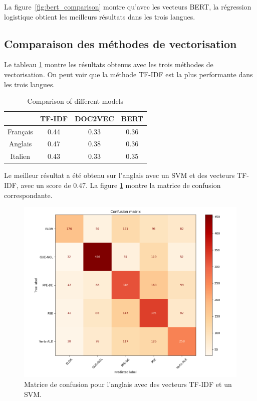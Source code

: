 La figure~\ref{fig:bert_comparison} montre qu'avec les vecteurs BERT, la régression logistique obtient les meilleurs résultats dans les trois langues.




\subsection{Comparaison des méthodes de vectorisation}

Le tableau \ref{tab:comparaison_vecteurs} montre les résultats obtenus avec les trois méthodes de vectorisation. On peut voir que la méthode TF-IDF est la plus performante dans les trois langues.

\begin{table}[h]
    \centering
    \begin{tabular}{|c|c|c|c|}
        \hline
        & TF-IDF & DOC2VEC & BERT \\
        \hline
        Français & 0.44 & 0.33 & 0.36 \\
        \hline
        Anglais & 0.47 & 0.38 & 0.36 \\
        \hline
        Italien & 0.43 & 0.33 & 0.35 \\
        \hline
    \end{tabular}
    \caption{Comparison of different models}
    \label{tab:comparaison_vecteurs}
\end{table}

Le meilleur résultat a été obtenu sur l'anglais avec un SVM et des vecteurs TF-IDF, avec un score de 0.47. La figure \ref{fig:tfidf_comparison} montre la matrice de confusion correspondante.

\begin{figure}[t]
  \includegraphics[width=\columnwidth]{"./assets/confusion_matrix_en_tfidf.png"}
  \caption{Matrice de confusion pour l'anglais avec des vecteurs TF-IDF et un SVM.}
  \label{fig:tfidf_comparison}
\end{figure}